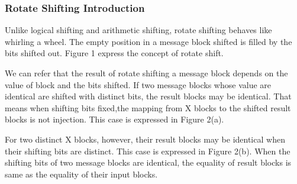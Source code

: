 \documentclass{article}
\begin{document}
\subsubsection{Rotate Shifting Introduction} 
Unlike logical shifting and arithmetic shifting, rotate shifting
behaves like whirling a wheel. The empty position in a message block shifted is
filled by the bits shifted out. Figure 1 express the concept of rotate shift.

We can refer that the result of rotate shifting a message block depends on the
value of block and the bits shifted.  If two message blocks whose value are
identical are shifted with distinct bits, the result blocks may be
identical. That means when shifting bits fixed,the mapping from X blocks to the
shifted result blocks is not injection. This case is expressed in Figure 2(a).

For two distinct X blocks, however, their result blocks may be identical
when their shifting bits are distinct. This case is expressed in Figure 2(b).  
When the shifting bits of two message blocks are identical, the equality of result blocks
is same as the equality of their input blocks.				
\end{document}
